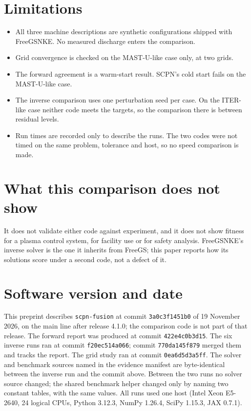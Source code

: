 \documentclass[11pt]{article}
\begin{document}
\section{Limitations}

\begin{itemize}
\item All three machine descriptions are synthetic configurations shipped with
FreeGSNKE.  No measured discharge enters the comparison.
\item Grid convergence is checked on the MAST-U-like case only, at two grids.
\item The forward agreement is a warm-start result.  SCPN's cold start fails on
the MAST-U-like case.
\item The inverse comparison uses one perturbation seed per case.  On the
ITER-like case neither code meets the targets, so the comparison there is
between residual levels.
\item Run times are recorded only to describe the runs.  The two codes were not
timed on the same problem, tolerance and host, so no speed comparison is made.
\end{itemize}

\section{What this comparison does not show}

It does not validate either code against experiment, and it does not show
fitness for a plasma control system, for facility use or for safety analysis.
FreeGSNKE's inverse solver is the one it inherits from FreeGS; this paper
reports how its solutions score under a second code, not a defect of it.

\section*{Software version and date}

This preprint describes \texttt{scpn-fusion} at commit \texttt{3a0c3f1451b0}
of 19 November 2026, on the main line after release 4.1.0; the comparison code
is not part of that release.  The forward report was produced at commit
\texttt{422e4c0b3d15}.  The six inverse runs ran at commit
\texttt{f20ec514a066}; commit \texttt{770da145f879} merged them and tracks the
report.  The grid study ran at commit \texttt{0ea6d5d3a5ff}.  The solver and benchmark sources named in the
evidence manifest are byte-identical between the inverse run and the commit
above.  Between the two runs no solver source changed; the shared benchmark
helper changed only by naming two constant tables, with the same values.  All runs used one host (Intel Xeon E5-2640, 24 logical CPUs, Python
3.12.3, NumPy 1.26.4, SciPy 1.15.3, JAX 0.7.1).
\end{document}
